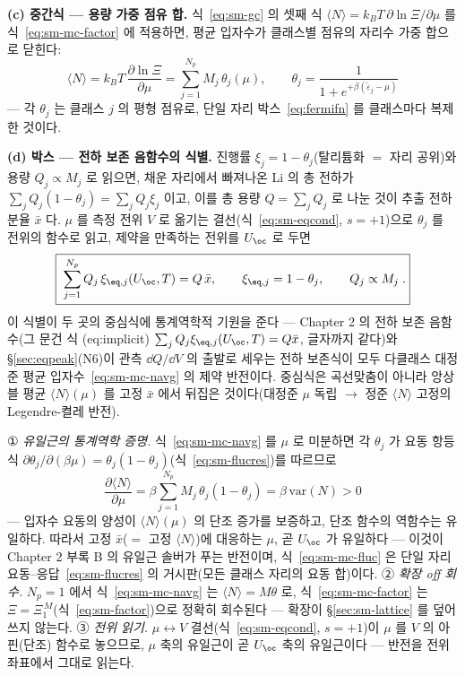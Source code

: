\textbf{(c) 중간식 --- 용량 가중 점유 합.} 식~\eqref{eq:sm-gc} 의 셋째 식
$\langle N\rangle=k_BT\,\partial\ln\Xi/\partial\mu$ 를 식~\eqref{eq:sm-mc-factor} 에 적용하면, 평균 입자수가
클래스별 점유의 자리수 가중 합으로 닫힌다:
\begin{equation}
\langle N\rangle=k_BT\,\frac{\partial\ln\Xi}{\partial\mu}
=\sum_{j=1}^{N_p}M_j\,\theta_j(\mu),
\qquad
\theta_j=\frac{1}{1+e^{+\beta(\tilde\varepsilon_j-\mu)}}
\label{eq:sm-mc-navg}
\end{equation}
--- 각 $\theta_j$ 는 클래스 $j$ 의 평형 점유로, 단일 자리 박스~\eqref{eq:fermifn} 를 클래스마다 복제한 것이다.

\textbf{(d) 박스 --- 전하 보존 음함수의 식별.} 진행률 $\xi_j=1-\theta_j$(탈리튬화 $=$ 자리 공위)와 용량
$Q_j\propto M_j$ 로 읽으면, 채운 자리에서 빠져나온 Li 의 총 전하가 $\sum_jQ_j(1-\theta_j)=\sum_jQ_j\xi_j$ 이고,
이를 총 용량 $Q=\sum_jQ_j$ 로 나눈 것이 추출 전하 분율 $\bar x$ 다. $\mu$ 를 측정 전위 $V$ 로 옮기는
결선(식~\eqref{eq:sm-eqcond}, $s=+1$)으로 $\theta_j$ 를 전위의 함수로 읽고, 제약을 만족하는 전위를 $U_\oc$ 로
두면
\begin{equation}
\boxed{\;\sum_{j=1}^{N_p}Q_j\,\xi_{\eq,j}(U_\oc,T)=Q\,\bar x,
\qquad \xi_{\eq,j}=1-\theta_j,\qquad Q_j\propto M_j\;.}
\label{eq:sm-mc-charge}
\end{equation}
이 식별이 두 곳의 중심식에 통계역학적 기원을 준다 --- Chapter 2 의 전하 보존 음함수(그 문건 식
(eq:implicit) $\sum_jQ_j\xi_{\eq,j}(U_\oc,T)=Q\bar x$, 글자까지 같다)와 \S\ref{sec:eqpeak}(N6)이 관측
$\dd Q/\dd V$ 의 출발로 세우는 전하 보존식이 모두 다클래스 대정준 평균 입자수~\eqref{eq:sm-mc-navg} 의 제약
반전이다. 중심식은 곡선맞춤이 아니라 앙상블 평균 $\langle N\rangle(\mu)$ 를 고정 $\bar x$ 에서 뒤집은
것이다(대정준 $\mu$ 독립 $\to$ 정준 $\langle N\rangle$ 고정의 Legendre-켤레 반전).
\begin{verifybox}
① \emph{유일근의 통계역학 증명.} 식~\eqref{eq:sm-mc-navg} 를 $\mu$ 로 미분하면 각 $\theta_j$ 가 요동
항등식 $\partial\theta_j/\partial(\beta\mu)=\theta_j(1-\theta_j)$(식~\eqref{eq:sm-flucres})를 따르므로
\begin{equation}
\frac{\partial\langle N\rangle}{\partial\mu}
=\beta\sum_{j=1}^{N_p}M_j\,\theta_j(1-\theta_j)=\beta\,\mathrm{var}(N)>0
\label{eq:sm-mc-fluc}
\end{equation}
--- 입자수 요동의 양성이 $\langle N\rangle(\mu)$ 의 단조 증가를 보증하고, 단조 함수의 역함수는 유일하다.
따라서 고정 $\bar x$($=$ 고정 $\langle N\rangle$)에 대응하는 $\mu$, 곧 $U_\oc$ 가 유일하다 --- 이것이 Chapter 2
부록 B 의 유일근 솔버가 푸는 반전이며, 식~\eqref{eq:sm-mc-fluc} 은 단일 자리 요동--응답~\eqref{eq:sm-flucres}
의 거시판(모든 클래스 자리의 요동 합)이다.
② \emph{확장 off 회수.} $N_p=1$ 에서 식~\eqref{eq:sm-mc-navg} 는 $\langle N\rangle=M\theta$ 로,
식~\eqref{eq:sm-mc-factor} 는 $\Xi=\Xi_1^{\,M}$(식~\eqref{eq:sm-factor})으로 정확히 회수된다 --- 확장이
\S\ref{sec:sm-lattice} 를 덮어쓰지 않는다.
③ \emph{전위 읽기.} $\mu\leftrightarrow V$ 결선(식~\eqref{eq:sm-eqcond}, $s=+1$)이 $\mu$ 를 $V$ 의
아핀(단조) 함수로 놓으므로, $\mu$ 축의 유일근이 곧 $U_\oc$ 축의 유일근이다 --- 반전을 전위 좌표에서 그대로
읽는다.
\end{verifybox}

